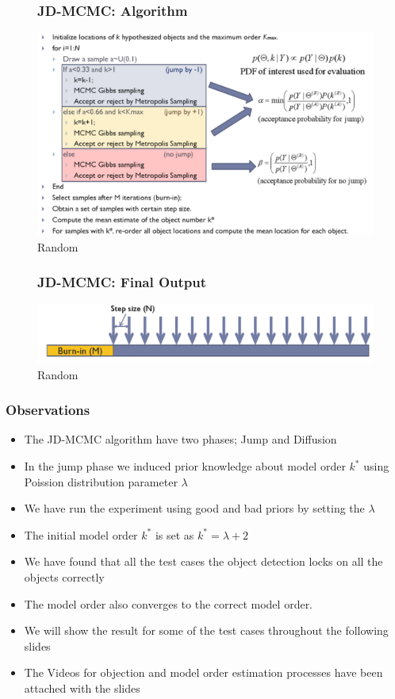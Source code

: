 \documentclass[11pt]{beamer}
\begin{document}
\begin{frame}
\begin{figure}
  \frametitle{JD-MCMC: Algorithm}
  \includegraphics[width=.9\textheight]{JD-MCMC.png}
  \caption{Random}
\end{figure}
\end{frame}

\begin{frame}
\begin{figure}
  \frametitle{JD-MCMC: Final Output}
  \includegraphics[width=.9\textheight]{Final.png}
  \caption{Random}
\end{figure}
\end{frame}

\begin{frame}
\frametitle{Observations}
	\begin{itemize}
		\item The JD-MCMC algorithm have two phases; Jump and Diffusion
    	\item In the jump phase we induced prior knowledge about model order $k^*$ using Poission distribution parameter $\lambda$
		\item We have run the experiment using good and bad priors by setting the $\lambda$
		\item The initial model order $k^*$ is set as $k^*=\lambda +2$
		\item We have found that all the test cases the object detection locks on all the objects correctly
		\item The model order also converges to the correct model order.
		\item We will show the result for some of the test cases throughout the following slides
		\item The Videos for objection and model order estimation processes have been attached with the slides
	\end{itemize}
\end{frame}
\end{document}
